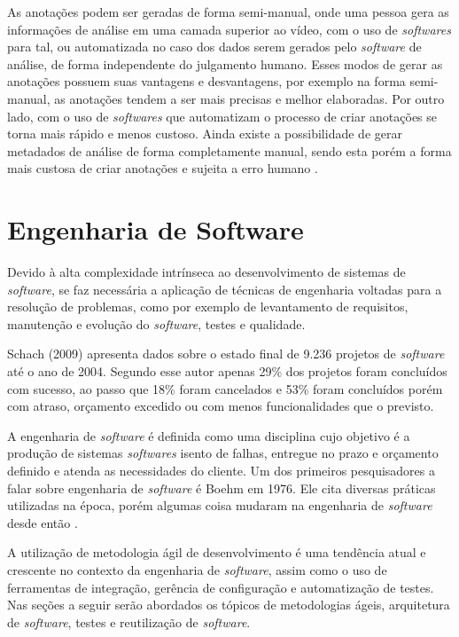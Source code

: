 As anotações podem ser geradas de forma semi-manual, onde uma pessoa gera as informações de análise em uma camada superior ao vídeo, com o uso de \textit{softwares} para tal, ou automatizada no caso dos dados serem gerados pelo \textit{software} de análise, de forma independente do julgamento humano. Esses modos de gerar as anotações possuem suas vantagens e desvantagens, por exemplo na forma semi-manual, as anotações tendem a ser mais precisas e melhor elaboradas. Por outro lado, com o uso de \textit{softwares} que automatizam o processo de criar anotações se torna mais rápido e menos custoso. Ainda existe a possibilidade de gerar metadados de análise de forma completamente manual, sendo esta porém a forma mais custosa de criar anotações e sujeita a erro humano \cite{sadallah2012}.

\section{Engenharia de Software}

Devido à alta complexidade intrínseca ao desenvolvimento de sistemas de \textit{software}, se faz necessária a aplicação de técnicas de engenharia voltadas para a resolução de problemas, como por exemplo de levantamento de requisitos, manutenção e evolução do \textit{software}, testes e qualidade. 

Schach (2009) apresenta dados sobre o estado final de 9.236 projetos de \textit{software} até o ano de 2004. Segundo esse autor apenas 29\% dos projetos foram concluídos com sucesso, ao passo que 18\% foram cancelados e 53\% foram concluídos porém com atraso, orçamento excedido ou com menos funcionalidades que o previsto.

A engenharia de \textit{software} é definida como uma disciplina cujo objetivo é a produção de sistemas \textit{softwares} isento de falhas, entregue no prazo e orçamento definido e atenda as necessidades do cliente. Um dos primeiros pesquisadores a falar sobre engenharia de \textit{software} é  Boehm em 1976. Ele cita diversas práticas utilizadas na época, porém algumas coisa mudaram na engenharia de \textit{software} desde então \cite{schach2009, boehm1976}.

A utilização de metodologia ágil de desenvolvimento é uma tendência atual e crescente no contexto da engenharia de \textit{software}, assim como o uso de ferramentas de integração, gerência de configuração e automatização de testes. Nas seções a seguir serão abordados os tópicos de metodologias ágeis, arquitetura de \textit{software}, testes e reutilização de \textit{software}.


